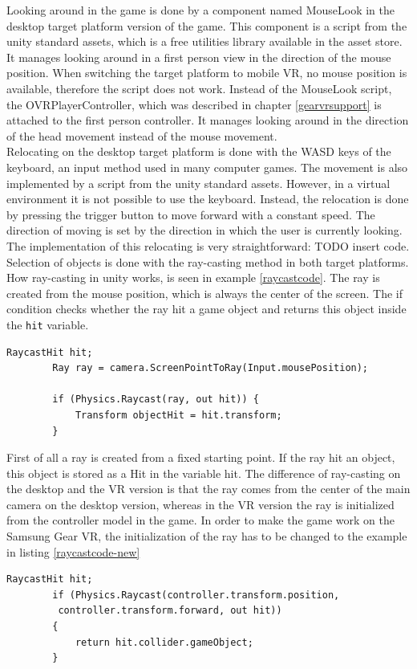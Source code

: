 Looking around in the game is done by a component named MouseLook in the desktop target platform version of the game. This component is a script from the unity standard assets, which is a free utilities library available in the asset store. It manages looking around in a first person view in the direction of the mouse position. When switching the target platform to mobile VR, no mouse position is available, therefore the script does not work. Instead of the MouseLook script, the OVRPlayerController, which was described in chapter \ref{gearvrsupport} is attached to the first person controller. It manages looking around in the direction of the head movement instead of the mouse movement.\\
Relocating on the desktop target platform is done with the WASD keys of the keyboard, an input method used in many computer games. The movement is also implemented by a script from the unity standard assets. However, in a virtual environment it is not possible to use the keyboard. Instead, the relocation is done by pressing the trigger button to move forward with a constant speed. The direction of moving is set by the direction in which the user is currently looking. The implementation of this relocating is very straightforward: TODO insert code.\\
Selection of objects is done with the ray-casting method in both target platforms. How ray-casting in unity works, is seen in example \ref{raycastcode}. The ray is created from the mouse position, which is always the center of the screen. The if condition checks whether the ray hit a game object and returns this object inside the \texttt{hit} variable.
\begin{lstlisting} 
RaycastHit hit;
        Ray ray = camera.ScreenPointToRay(Input.mousePosition);
        
        if (Physics.Raycast(ray, out hit)) {
            Transform objectHit = hit.transform;
        }
\end{lstlisting}
\label{raycastcode}
First of all a ray is created from a fixed starting point. If the ray hit an object, this object is stored as a Hit in the variable hit. The difference of ray-casting on the desktop and the VR version is that the ray comes from the center of the main camera on the desktop version, whereas in the VR version the ray is initialized from the controller model in the game. In order to make the game work on the Samsung Gear VR, the initialization of the ray has to be changed to the example in listing \ref{raycastcode-new}
\begin{lstlisting} 
RaycastHit hit;
        if (Physics.Raycast(controller.transform.position,
         controller.transform.forward, out hit))
        {
            return hit.collider.gameObject;
        }
\end{lstlisting}
\label{raycastcode-new}

